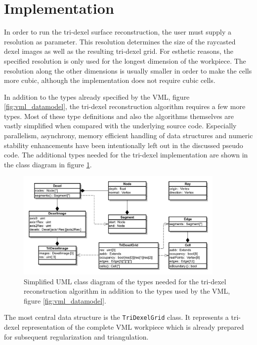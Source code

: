 \section{Implementation}
\label{sec:tri_dexel_implementation}

In order to run the tri-dexel surface reconstruction, the user must supply a resolution as parameter.
This resolution determines the size of the raycasted dexel images as well as the resulting tri-dexel grid.
For esthetic reasons, the specified resolution is only used for the longest dimension of the workpiece.
The resolution along the other dimensions is usually smaller in order to make the cells more cubic, although the implementation does not require cubic cells.


In addition to the types already specified by the VML, \cf figure \ref{fig:vml_datamodel}, the tri-dexel reconstruction algorithm requires a few more types.
Most of these type definitions and also the algorithms themselves are vastly simplified when compared with the underlying source code.
Especially parallelism, asynchrony, memory efficient handling of data structures and numeric stability enhancements have been intentionally left out in the discussed pseudo code.
The additional types needed for the tri-dexel implementation are shown in the class diagram in figure \ref{fig:tri_dexel_datamodel}.
%
\begin{figure}
	\centering
	\includegraphics[width=0.9\textwidth]{images/tri_dexel_datamodel}
	\caption{
		Simplified UML class diagram of the types needed for the tri-dexel reconstruction algorithm in addition to the types used by the VML, \cf figure \ref{fig:vml_datamodel}.
	}
	\label{fig:tri_dexel_datamodel}
\end{figure}
%
The most central data structure is the \lstinline!TriDexelGrid! class.
It represents a tri-dexel representation of the complete VML workpiece which is already prepared for subsequent regularization and triangulation.
